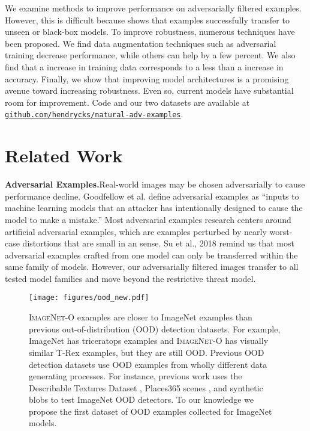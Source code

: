 \documentclass[10pt,twocolumn,letterpaper]{article}
\begin{document}
We examine methods to improve performance on adversarially filtered examples. However, this is difficult because  shows that examples successfully transfer to unseen or black-box models.
To improve robustness, numerous techniques have been proposed. We find data augmentation techniques such as adversarial training decrease performance, while others can help by a few percent. We also find that a  increase in training data corresponds to a less than a  increase in accuracy. Finally, we show that improving model architectures is a promising avenue toward increasing robustness. Even so, current models have substantial room for improvement. Code and our two datasets are available at \href{https://github.com/hendrycks/natural-adv-examples}{\texttt{github.com/hendrycks/natural-adv-examples}}. %
 
\section{Related Work}
\noindent\textbf{Adversarial Examples.}\quad Real-world images may be chosen adversarially to cause performance decline. Goodfellow et al. \cite{goodfellowblog} define adversarial examples \cite{adversarial} as ``inputs to machine learning models that an attacker has intentionally designed to cause the model to make a mistake.'' Most adversarial examples research centers around artificial  adversarial examples, which are examples perturbed by nearly worst-case distortions that are small in an  sense. Su et al., 2018 \cite{Su2018IsRT} remind us that most  adversarial examples crafted from one model can only be transferred within the same family of models. However, our adversarially filtered images transfer to all tested model families and move beyond the restrictive  threat model.








\begin{figure}
\centering
\texttt{[image: figures/ood\_new.pdf]}
\caption{
\textsc{ImageNet-O} examples are closer to ImageNet examples than previous out-of-distribution (OOD) detection datasets. For example, ImageNet has triceratops examples and \textsc{ImageNet-O} has visually similar T-Rex examples, but they are still OOD.
Previous OOD detection datasets use OOD examples from wholly different data generating processes. For instance, previous work uses the Describable Textures Dataset \cite{cimpoi14describing}, Places365 scenes \cite{zhou2017places}, and synthetic blobs to test ImageNet OOD detectors.
To our knowledge we propose the first dataset of OOD examples collected for ImageNet models.}\label{fig:ood}
\vspace{-5pt}
\end{figure}
\end{document}
